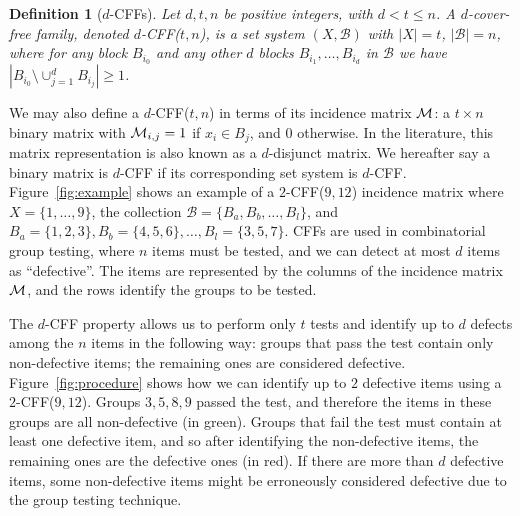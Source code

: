 \documentclass[12pt]{article}
\newtheorem{definition}{Definition}
\begin{document}
\begin{definition}[$d$-CFFs]\label{def:cff}
Let $d, t, n$ be positive integers, with $d < t \leq n$. A $d$-cover-free family, denoted \emph{$d$-CFF($t,n$)}, is a set system $(X, \mathcal{B})$ with $|X| = t$, $|\mathcal{B}| = n$, where for any block $B_{i_0}$ and any other $d$ blocks $B_{i_1}, \ldots, B_{i_d}$ in $\mathcal{B}$ we have $|B_{i_0} \setminus \cup_{j=1}^d B_{i_j}| \geq 1$.
\end{definition}

We may also define a $d$-CFF($t,n$) in terms of its incidence matrix $\mathcal{M}$: a $t \times n$ binary matrix with $\mathcal{M}_{i,j} = 1$ if $x_i \in B_j$, and $0$ otherwise. In the literature, this matrix representation is also known as a $d$-disjunct matrix. We hereafter say a binary matrix is $d$-CFF if its corresponding set system is $d$-CFF. Figure~\ref{fig:example} shows an example of a $2$-CFF($9, 12$) incidence matrix where $X = \{1, \ldots, 9\}$, the collection $\mathcal{B} = \{B_a, B_b, \ldots, B_{l}\}$, and $B_a = \{1,2,3\}, B_b = \{4,5,6\}, \ldots, B_{l} = \{3, 5, 7\}$. CFFs are used in combinatorial group testing, where $n$ items must be tested, and we can detect at most $d$ items as ``defective''. The items are represented by the columns of the incidence matrix $\mathcal{M}$, and the rows identify the groups to be tested. 




The $d$-CFF property allows us to perform only $t$ tests and identify up to $d$ defects among the $n$ items in the following way: groups that pass the test contain only non-defective items; the remaining ones are considered defective. 
Figure~\ref{fig:procedure} shows how we can identify up to $2$ defective items using a $2$-CFF($9,12$). Groups $3, 5, 8, 9$ passed the test, and therefore the items in these groups are all non-defective (in green). Groups that fail the test must contain at least one defective item, and so after identifying the non-defective items, the remaining ones are the defective ones (in red). If there are more than $d$ defective items, some non-defective items might be erroneously considered defective due to the group testing technique.


\end{document}
